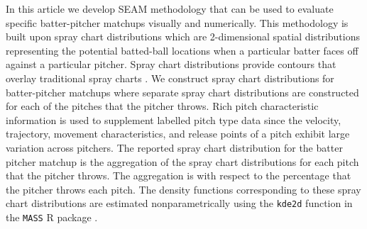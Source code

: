 \documentclass[12pt]{article}
\begin{document}
In this article we develop SEAM methodology that can be used to evaluate specific batter-pitcher matchups visually and numerically. This methodology is built upon spray chart distributions which are 2-dimensional spatial distributions representing the potential batted-ball locations when a particular batter faces off against a particular pitcher. Spray chart distributions provide contours that overlay traditional spray charts \citep{pettispray, marchi2019analyzing}. We construct spray chart distributions for batter-pitcher matchups where separate spray chart distributions are constructed for each of the pitches that the pitcher throws. Rich pitch characteristic information is used to supplement labelled pitch type data since the velocity, trajectory, movement characteristics, and release points of a pitch exhibit large variation across pitchers. The reported spray chart distribution for the batter pitcher matchup is the aggregation of the spray chart distributions for each pitch that the pitcher throws. The aggregation is with respect to the percentage that the pitcher throws each pitch. The density functions corresponding to these spray chart distributions are estimated nonparametrically using the \texttt{kde2d} function in the \texttt{MASS} R package \citep{MASS}.
\end{document}
